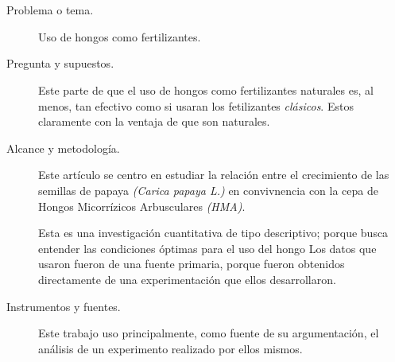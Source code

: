 \documentclass[10pt]{beamer}
\begin{document}
\section{\cite{inv 3}}
	\begin{frame}{\cite{inv 3}}
		\begin{description}
			\item[Problema o tema.] Uso de hongos como fertilizantes.
			\item[Pregunta y supuestos.] Este parte de que el uso de hongos como fertilizantes naturales es, al menos, tan efectivo como si usaran los fetilizantes \textit{clásicos}. Estos claramente con la ventaja de que son naturales.
		\end{description}
	\end{frame}
	\begin{frame}{\cite{inv 3}}
		\begin{description}
			\item[Alcance y metodología.] Este artículo se centro en estudiar la relación entre el crecimiento de las semillas de papaya \textit{(Carica papaya L.)} en convivnencia con la cepa de Hongos Micorrízicos Arbusculares \textit{(HMA)}.
			\par Esta es una investigación cuantitativa de tipo descriptivo; porque busca entender las condiciones óptimas para el uso del hongo  Los datos que usaron fueron de una fuente primaria, porque fueron obtenidos directamente de una experimentación que ellos desarrollaron.
			
			\item[Instrumentos y fuentes.] Este trabajo uso principalmente, como fuente de su argumentación, el análisis de un experimento realizado por ellos mismos.
		\end{description}
		
	\end{frame}




\newpage
\scriptsize
\end{document}
